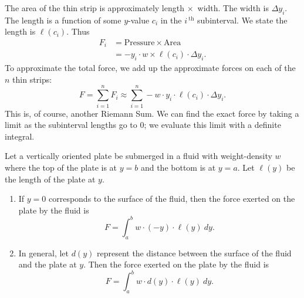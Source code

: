 The area of the thin strip is approximately length $\times$\ width. The width is $\Delta y_i$. The length is a function of some $y$-value $c_i$ in the $i\,^\text{th}$ subinterval. We state the length is $\ell(c_i)$. Thus 
\begin{align*}
	F_i	&= \text{Pressure} \times \text{Area} \\
		&=	-y_i\cdot w \times \ell(c_i)\cdot\Delta y_i.
\end{align*}
To approximate the total force, we add up the approximate forces on each of the $n$ thin strips:
\[
F = \sum_{i=1}^n F_i \approx \sum_{i=1}^n -w\cdot y_i\cdot\ell(c_i)\cdot\Delta y_i.
\]
This is, of course, another Riemann Sum. We can find the exact force by taking a limit as the subinterval lengths go to 0; we evaluate this limit with a definite integral.

\begin{keyidea}\label{idea:fluid_force}
Let a vertically oriented plate be submerged in a fluid with weight-density $w$ where the top of the plate is at $y=b$ and the bottom is at $y=a$. Let $\ell(y)$ be the length of the plate at $y$.
\begin{enumerate}
	\item	If $y=0$ corresponds to the surface of the fluid, then the force exerted on the plate by the fluid is
	\[F=\int_a^b w\cdot(-y)\cdot\ell(y)\ dy.\]
	\item	In general, let $d(y)$ represent the distance between the surface of the fluid and the plate at $y$. Then the force exerted on the plate by the fluid is 
	\[F=\int_a^b w\cdot d(y)\cdot\ell(y)\ dy.\]
\end{enumerate}
\end{keyidea}

